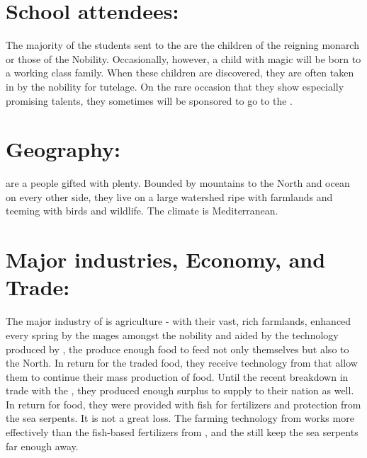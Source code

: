 \documentclass[blue]{GL2020}
\begin{document}
\section*{School attendees:}

The majority of the students sent to the \pSchool{} are the children of the reigning monarch or those of the Nobility. Occasionally, however, a child with magic will be born to a working class family.  When these children are discovered, they are often taken in by the nobility for tutelage.  On the rare occasion that they show especially promising talents, they sometimes will be sponsored to go to the \pSchool{}.



\section*{Geography:}

\pFarmers{} are a people gifted with plenty.  Bounded by mountains to the North and ocean on every other side, they live on a large watershed ripe with farmlands and teeming with birds and wildlife.  The climate is Mediterranean.


\section*{Major industries, Economy, and Trade:}

The major industry of \pFarm{} is agriculture - with their vast, rich farmlands, enhanced every spring by the mages amongst the nobility and aided by the technology produced by \pTech{}, the \pFarmers{} produce enough food to feed not only themselves but also \pTech{} to the North.  In return for the traded food, they receive technology from \pTech{} that allow them to continue their mass production of food.  Until the recent breakdown in trade with the \pShippies{}, they produced enough surplus to supply to their nation as well.  In return for food, they were provided with fish for fertilizers and protection from the sea serpents.  It is not a great loss.  The farming technology from \pTech{} works more effectively than the fish-based fertilizers from \pShip{}, and the \pShippies{} still keep the sea serpents far enough away.
\end{document}
